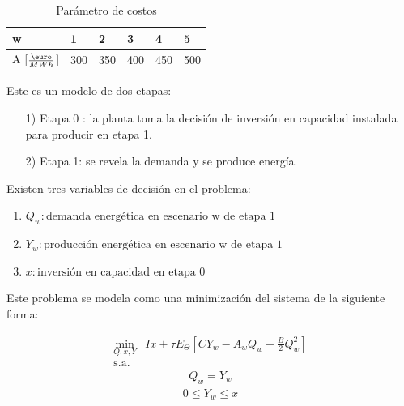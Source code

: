 \begin{table}[H]
\centering
\begin{tabular}{|l|l|l|l|l|l|}
\hline
\textbf{w} & \textbf{1} & \textbf{2} & 3 & 4 & 5 \\ \hline
A {[$\frac{\textup{\euro}}{MWh}$]} & 300 & 350 & 400 & 450 & 500 \\ \hline
\end{tabular}
\caption{Parámetro de costos}
\end{table}

\vspace{2.5mm}

Este es un modelo de dos etapas:
\begin{enumerate}
    \item[1)] Etapa 0 : la planta toma la decisión de inversión en capacidad instalada para producir en etapa 1.
    \item[2)] Etapa 1: se revela la demanda y se produce energía.
\end{enumerate}

Existen tres variables de decisión en el problema:
\vspace{2.5mm}
\begin{enumerate}
    \item $Q_w: \text{demanda energética en escenario w de etapa 1}$
    \item $Y_w: \text{producción energética en escenario w de etapa 1}$
    \item $x: \text{inversión en capacidad en etapa 0}$
\end{enumerate}

Este problema se modela como una minimización del sistema de la siguiente forma:

\begin{equation}
\begin{array}{rrclcl}
    \displaystyle \min_{Q,x,Y} & Ix+\tau E_{\Theta}[CY_w-A_wQ_w+\frac{B}{2}Q_w^2]  \\\textrm{s.a.} \label{eq:331}
\end{array}
\end{equation}
\begin{equation}
\begin{array}{cl}
    Q_w=Y_w \label{res1:331}
\end{array}
\end{equation}
\begin{equation}
\begin{array}{cl}
   0\leq Y_w \leq x\label{res2:331}
\end{array}
\end{equation}

